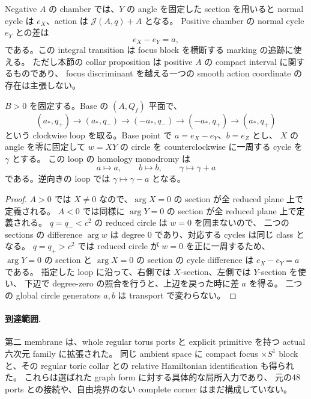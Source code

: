Negative $A$ の chamber では、$Y$ の angle を固定した section を用いると
normal cycle は $e_X$、action は $\mathcal J(A,q)+A$ となる。
Positive chamber の normal cycle $e_Y$ との差は
\[
 e_X-e_Y=a,
\]
である。この integral transition は focus block を横断する marking の追跡に使える。
ただし本節の collar proposition は positive $A$ の compact interval に関するものであり、
focus discriminant を越える一つの smooth action coordinate の存在は主張しない。

\begin{proposition}\label{mft:monodromy}
$B>0$ を固定する。Base の $(A,Q_f)$ 平面で、
\[
 (a_*,q_+)\longrightarrow(a_*,q_-)
 \longrightarrow(-a_*,q_-)
 \longrightarrow(-a_*,q_+)\longrightarrow(a_*,q_+)
\]
という clockwise loop を取る。Base point で $a=e_X-e_Y$、$b=e_Z$ とし、
$X$ の angle を零に固定して $w=XY$ の circle を counterclockwise に一周する cycle を $\gamma$ とする。
この loop の homology monodromy は
\[
 a\longmapsto a,\qquad b\longmapsto b,\qquad
 \gamma\longmapsto\gamma+a
\]
である。逆向きの loop では $\gamma\mapsto\gamma-a$ となる。
\end{proposition}

\begin{proof}
$A>0$ では $X\ne0$ なので、$\arg X=0$ の section が全 reduced plane 上で定義される。
$A<0$ では同様に $\arg Y=0$ の section が全 reduced plane 上で定義される。
$q=q_-<c^2$ の reduced circle は $w=0$ を囲まないので、
二つの sections の difference $\arg w$ は degree $0$ であり、対応する cycles は同じ class となる。
$q=q_+>c^2$ では reduced circle が $w=0$ を正に一周するため、
$\arg Y=0$ の section と $\arg X=0$ の section の cycle difference は
$e_X-e_Y=a$ である。
指定した loop に沿って、右側では $X$-section、左側では $Y$-section を使い、
下辺で degree-zero の照合を行うと、上辺を戻った時に差 $a$ を得る。
二つの global circle generators $a,b$ は transport で変わらない。
\end{proof}

\paragraph{到達範囲.}
第二 membrane は、whole regular torus ports と explicit primitive を持つ actual 六次元 family に拡張された。
同じ ambient space に compact focus $\times S^1$ block と、その regular toric collar との
relative Hamiltonian identification も得られた。
これらは選ばれた graph form に対する具体的な局所入力であり、
元の48 ports との接続や、自由境界のない complete corner はまだ構成していない。
